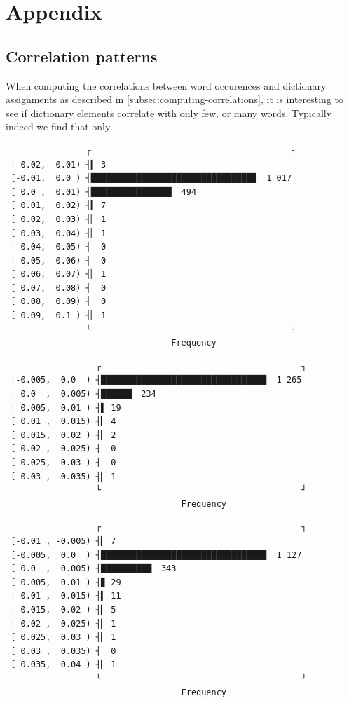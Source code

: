\documentclass[11pt]{article}
\begin{document}
\section{Appendix}
\label{sec:org0c5e132}
\subsection{Correlation patterns}
\label{sec:orgb374034}
When computing the correlations between word occurences and dictionary assignments as described in \ref{subsec:computing-correlations}, it is interesting to see if dictionary elements correlate with only few, or many words.
Typically indeed we find that only

\begin{verbatim}
                ┌                                        ┐
 [-0.02, -0.01) ┤▎ 3
 [-0.01,  0.0 ) ┤█████████████████████████████████  1 017
 [ 0.0 ,  0.01) ┤████████████████▏ 494
 [ 0.01,  0.02) ┤▎ 7
 [ 0.02,  0.03) ┤▏ 1
 [ 0.03,  0.04) ┤▏ 1
 [ 0.04,  0.05) ┤  0
 [ 0.05,  0.06) ┤  0
 [ 0.06,  0.07) ┤▏ 1
 [ 0.07,  0.08) ┤  0
 [ 0.08,  0.09) ┤  0
 [ 0.09,  0.1 ) ┤▏ 1
                └                                        ┘
                                 Frequency
\end{verbatim}

\begin{verbatim}
                  ┌                                        ┐
 [-0.005,  0.0  ) ┤█████████████████████████████████  1 265
 [ 0.0  ,  0.005) ┤██████▎ 234
 [ 0.005,  0.01 ) ┤▌ 19
 [ 0.01 ,  0.015) ┤▎ 4
 [ 0.015,  0.02 ) ┤▏ 2
 [ 0.02 ,  0.025) ┤  0
 [ 0.025,  0.03 ) ┤  0
 [ 0.03 ,  0.035) ┤▏ 1
                  └                                        ┘
                                   Frequency
\end{verbatim}

\begin{verbatim}
                  ┌                                        ┐
 [-0.01 , -0.005) ┤▎ 7
 [-0.005,  0.0  ) ┤█████████████████████████████████  1 127
 [ 0.0  ,  0.005) ┤██████████▏ 343
 [ 0.005,  0.01 ) ┤▊ 29
 [ 0.01 ,  0.015) ┤▍ 11
 [ 0.015,  0.02 ) ┤▎ 5
 [ 0.02 ,  0.025) ┤▏ 1
 [ 0.025,  0.03 ) ┤▏ 1
 [ 0.03 ,  0.035) ┤  0
 [ 0.035,  0.04 ) ┤▏ 1
                  └                                        ┘
                                   Frequency
\end{verbatim}
\end{document}
